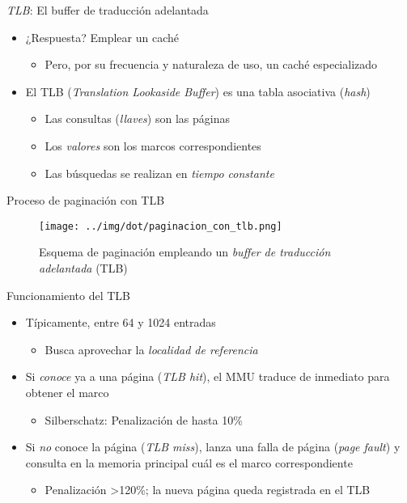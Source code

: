 \documentclass[presentation]{beamer}
\begin{document}
\begin{frame}[label={sec:orga6473be}]{\emph{TLB}: El buffer de traducción adelantada}
\begin{itemize}
\item ¿Respuesta? Emplear un caché
\begin{itemize}
\item Pero, por su frecuencia y naturaleza de uso, un caché especializado
\end{itemize}
\item El TLB (\emph{Translation Lookaside Buffer}) es una tabla asociativa
(\emph{hash})
\begin{itemize}
\item Las consultas (\emph{llaves}) son las páginas
\item Los \emph{valores} son los marcos correspondientes
\item Las búsquedas se realizan en \emph{tiempo constante}
\end{itemize}
\end{itemize}
\end{frame}

\begin{frame}[label={sec:orgc93cb86}]{Proceso de paginación con TLB}
\begin{figure}[htbp]
\centering
\texttt{[image: ../img/dot/paginacion\_con\_tlb.png]}
\caption{Esquema de paginación empleando un \emph{buffer de traducción adelantada} (TLB)}
\end{figure}
\end{frame}

\begin{frame}[label={sec:org916eba8}]{Funcionamiento del TLB}
\begin{itemize}
\item Típicamente, entre 64 y 1024 entradas
\begin{itemize}
\item Busca aprovechar la \emph{localidad de referencia}
\end{itemize}
\item Si \emph{conoce} ya a una página (\emph{TLB hit}), el MMU traduce de inmediato
para obtener el marco
\begin{itemize}
\item Silberschatz: Penalización de hasta 10\%
\end{itemize}
\item Si \emph{no} conoce la página (\emph{TLB miss}), lanza una falla de página
(\emph{page fault}) y consulta en la memoria principal cuál es el marco
correspondiente
\begin{itemize}
\item Penalización >120\%; la nueva página queda registrada en el TLB
\end{itemize}
\end{itemize}
\end{frame}
\end{document}
